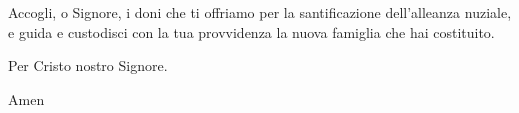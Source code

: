 \documentclass[11pt]{book}
\begin{document}
\benedizioneanelli[4]

\consegnaAnelli

\vspace{55pt}

\begin{center}
\def\svgscale{0.40}

\end{center}



\newpage


\introfedeli

\preghierefedeli

\pagebreak

\renewcommand{\personallitania}{
San Francesco d'Assisi, & \textbf{prega per noi}\\
Santa Vittoria, & \textbf{prega per noi}\\
}
\renewcommand{\litasposo}{San Nicolò, & \textbf{prega per noi}\\}
\renewcommand{\litasposa}{Santa Elisabetta, & \textbf{prega per noi}\\}
\renewcommand{\litachiesa}{
San Sebastiano, & \textbf{prega per noi}\\
Santo Stefano, & \textbf{prega per noi}\\
San Martino, & \textbf{prega per noi}\\
}
\introlitanie

\litanie

\newpage


\celebrante
{Accogli, o Signore, i doni che ti offriamo per la santificazione dell'alleanza nuziale,
e guida e custodisci con la tua provvidenza la nuova famiglia che hai costituito.

Per Cristo nostro Signore.}
{Amen}

\prefazio

\vspace{15pt}

\settowidth{\versewidth}{Benedetto colui che viene nel nome del Signore.}
\begin{canzone}[\versewidth]
\textbf{\santosanto}
\end{canzone}

\newpage
\pregheucar
\end{document}
